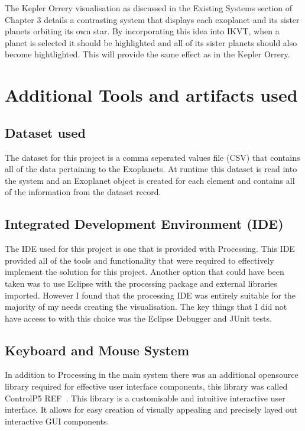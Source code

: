 The Kepler Orrery visualisation as discussed in the Existing Systems section of
Chapter 3 details a contrasting system that displays each exoplanet and its
sister planets orbiting its own star. By incorporating this idea into IKVT, when
a planet is selected it should be highlighted and all of its sister planets
should also become hightlighted. This will provide the same effect as in the
Kepler Orrery.  

\section{Additional Tools and artifacts used}
\subsection{Dataset used}
The dataset for this project is a comma seperated values file (CSV) that
contains all of the data pertaining to the Exoplanets. At runtime this dataset
is read into the system and an Exoplanet object is created for each element and
contains all of the information from the dataset record.

\subsection{Integrated Development Environment (IDE)}
The IDE used for this project is one that is provided with Processing. This IDE
provided all of the tools and functionality that were required to effectively
implement the solution for this project. Another option that could have been
taken was to use Eclipse with the processing package and external libraries
imported. However I found that the processing IDE was entirely suitable for the
majority of my needs creating the visualisation. The key things that I did not
have access to with this choice was the Eclipse Debugger and JUnit tests. ~   
\subsection{Keyboard and Mouse System}
In addition to Processing in the main system there was an additional opensource
library required for effective user interface components, this library was
called ControlP5 REF~. This library is a customisable and intuitive interactive
user interface. It allows for easy creation of visually appealing and precisely
layed out interactive GUI components.

